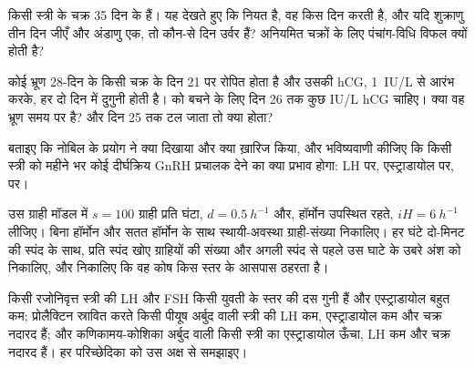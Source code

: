 \begin{exercise}[$\star\star$]\label{exo:b2:reproductive-hormones:7}
किसी स्त्री के चक्र 35 दिन के हैं। यह देखते हुए कि 
नियत है, वह किस दिन  करती है, और यदि शुक्राणु तीन दिन जीएँ
और अंडाणु एक, तो कौन-से दिन उर्वर हैं? अनियमित चक्रों के लिए
पंचांग-विधि विफल क्यों होती है?
\end{exercise}

\begin{exercise}[$\star\star$]\label{exo:b2:reproductive-hormones:8}
कोई भ्रूण 28-दिन के किसी चक्र के दिन 21 पर रोपित होता है और उसकी hCG,
\qty{1}{IU/L} से आरंभ करके, हर दो दिन में दुगुनी होती है।  को
बचने के लिए दिन 26 तक कुछ IU/L hCG चाहिए। क्या वह भ्रूण समय पर है? और
 दिन 25 तक टल जाता तो क्या होता?
\end{exercise}

\begin{exercise}[$\star\star$]\label{exo:b2:reproductive-hormones:9}
बताइए कि नोबिल के प्रयोग ने क्या दिखाया और क्या ख़ारिज किया, और
भविष्यवाणी कीजिए कि किसी स्त्री को महीने भर कोई दीर्घक्रिय GnRH प्रचालक
देने का क्या प्रभाव होगा: LH पर, एस्ट्राडायोल पर,  पर।
\end{exercise}

\begin{exercise}[$\star\star\star$]\label{exo:b2:reproductive-hormones:10}
उस ग्राही मॉडल में $s = 100$ ग्राही प्रति घंटा, $d =
\qty{0.5}{h^{-1}}$ और, हॉर्मोन उपस्थित रहते, $iH = \qty{6}{h^{-1}}$
लीजिए। बिना हॉर्मोन और सतत हॉर्मोन के साथ स्थायी-अवस्था ग्राही-संख्या
निकालिए। हर घंटे दो-मिनट की स्पंद के साथ, प्रति स्पंद खोए ग्राहियों की
संख्या और अगली स्पंद से पहले उस घाटे के उबरे अंश को निकालिए, और
निकालिए कि वह कोष किस स्तर के आसपास ठहरता है।
\end{exercise}

\begin{exercise}[$\star\star\star$]\label{exo:b2:reproductive-hormones:11}
किसी रजोनिवृत्त स्त्री की LH और FSH किसी युवती के स्तर की दस गुनी हैं
और एस्ट्राडायोल बहुत कम; प्रोलैक्टिन स्रावित करते किसी पीयूष अर्बुद
वाली स्त्री की LH कम, एस्ट्राडायोल कम और चक्र नदारद हैं; और
कणिकामय-कोशिका अर्बुद वाली किसी स्त्री का एस्ट्राडायोल ऊँचा, LH कम और
चक्र नदारद हैं। हर परिच्छेदिका को उस अक्ष से समझाइए।
\end{exercise}


